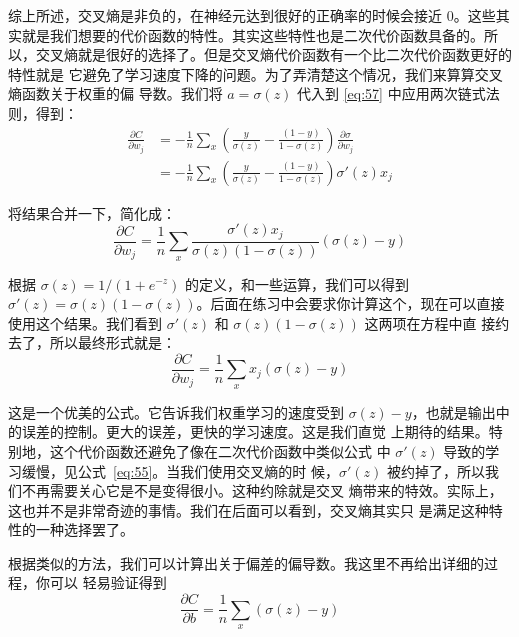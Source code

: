 综上所述，交叉熵是非负的，在神经元达到很好的正确率的时候会接近
$0$。这些其实就是我们想要的代价函数的特性。其实这些特性也是二次代价函数具备的。所
以，交叉熵就是很好的选择了。但是交叉熵代价函数有一个比二次代价函数更好的特性就是
它避免了学习速度下降的问题。为了弄清楚这个情况，我们来算算交叉熵函数关于权重的偏
导数。我们将 $a=\sigma(z)$ 代入到 \eqref{eq:57} 中应用两次链式法则，得到：
\begin{align}
  \frac{\partial C}{\partial w_j} &= -\frac{1}{n} \sum_x \left(
                                    \frac{y }{\sigma(z)} -\frac{(1-y)}{1-\sigma(z)} \right)
                                    \frac{\partial \sigma}{\partial w_j} \label{eq:58}\tag{58}\\
                                  &= -\frac{1}{n} \sum_x \left( 
                                    \frac{y}{\sigma(z)} 
                                    -\frac{(1-y)}{1-\sigma(z)} \right)\sigma'(z) x_j \label{eq:59}\tag{59}
\end{align}

将结果合并一下，简化成：
\begin{equation}
  \frac{\partial C}{\partial w_j} = \frac{1}{n}
  \sum_x \frac{\sigma'(z) x_j}{\sigma(z) (1-\sigma(z))}
  (\sigma(z)-y)
\label{eq:60}\tag{60}
\end{equation}

根据 $\sigma(z) = 1/(1+e^{-z})$ 的定义，和一些运算，我们可以得到
$\sigma'(z) = \sigma(z)(1-\sigma(z))$。后面在练习中会要求你计算这个，现在可以直接
使用这个结果。我们看到 $\sigma'(z)$ 和 $\sigma(z)(1-\sigma(z))$ 这两项在方程中直
接约去了，所以最终形式就是：
\begin{equation}
  \frac{\partial C}{\partial w_j} =  \frac{1}{n} \sum_x x_j(\sigma(z)-y)
\label{eq:61}\tag{61}
\end{equation}

这是一个优美的公式。它告诉我们权重学习的速度受到
$\sigma(z)-y$，也就是输出中的误差的控制。更大的误差，更快的学习速度。这是我们直觉
上期待的结果。特别地，这个代价函数还避免了像在二次代价函数中类似公式
中 $\sigma'(z)$ 导致的学习缓慢，见公式~\eqref{eq:55}。当我们使用交叉熵的时
候，$\sigma'(z)$ 被约掉了，所以我们不再需要关心它是不是变得很小。这种约除就是交叉
熵带来的特效。实际上，这也并不是非常奇迹的事情。我们在后面可以看到，交叉熵其实只
是满足这种特性的一种选择罢了。

根据类似的方法，我们可以计算出关于偏差的偏导数。我这里不再给出详细的过程，你可以
轻易验证得到
\begin{equation} 
  \frac{\partial C}{\partial b} = \frac{1}{n} \sum_x (\sigma(z)-y)
\label{eq:62}\tag{62}
\end{equation}

